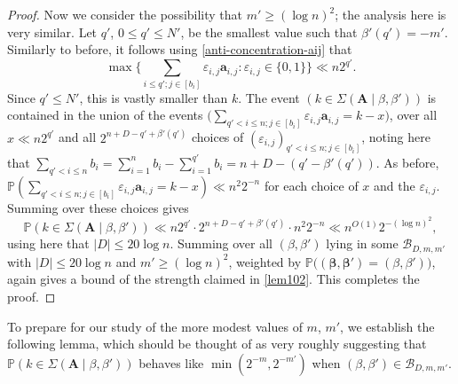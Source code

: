 \documentclass[11pt,reqno]{amsart}
\numberwithin{equation}{section}
\theoremstyle{definition}
\theoremstyle{remark}
\newcommand{\mb}{\mathbb}
\newcommand{\mbf}{\mathbf}
\newcommand{\eps}{\varepsilon}
\def\boldbeta{\boldsymbol\beta}
\renewcommand{\le}{\leqslant}
\renewcommand{\ge}{\geqslant}
\begin{document}
\begin{proof}
Now we consider the possibility that $m' \ge (\log n)^2$; the analysis here is very similar. Let $q'$, $0 \le q' \le N'$, be the smallest value such that $\beta'(q') = -m'$. Similarly to before, it follows using \cref{anti-concentration-aij} that
\begin{equation*} \max \{ \sum_{i \le q' ; j \in [b_i]} \eps_{i,j} \mbf{a}_{i,j}: \eps_{i,j} \in \{0,1\} \} \ll n 2^{q'}.
\end{equation*}
Since $q' \le N'$, this is vastly smaller than $k$. The event $(k \in \Sigma(\mbf{A} \mid \beta,\beta'))$ is contained in the union of the events $\big(\sum_{q' < i \le n;j \in [b_i]} \eps_{i,j} \mbf{a}_{i,j} = k - x\big)$, over all $x \ll n 2^{q'}$ and all $2^{n + D - q' + \beta'(q')}$ choices of $(\eps_{i,j})_{q' < i \le n; j \in [b_i]}$, noting here that $\sum_{q' < i \le n} b_i = \sum_{i = 1}^n b_i - \sum_{i = 1}^{q'} b_i = n + D - (q' - \beta'(q'))$. As before, $\mb{P}(\sum_{q' < i \le n;  j \in [b_i]} \eps_{i,j} \mbf{a}_{i,j} = k - x) \ll n^2 2^{-n}$ for each choice of $x$ and the $\eps_{i,j}$. Summing over these choices gives
\[ \mb{P}(k \in \Sigma(\mbf{A} \mid \beta,\beta')) \ll n 2^{q'} \cdot 2^{n +D - q' + \beta'(q')} \cdot n^2 2^{-n} \ll n^{O(1)} 2^{-(\log n)^2},\] using here that $|D| \le 20 \log n$. Summing over all $(\beta, \beta')$ lying in some $\mathscr{B}_{D,m,m'}$ with $|D| \le 20 \log n$ and $m' \ge (\log n)^2$, weighted by $\mb{P}\big((\boldbeta,\boldbeta') = (\beta,\beta')\big)$, again gives a bound of the strength claimed in \cref{lem102}. This completes the proof.
\end{proof}

To prepare for our study of the more modest values of $m$, $m'$, we establish the following lemma, which should be thought of as very roughly suggesting that $\mb{P}(k \in \Sigma(\mbf{A} \mid \beta,\beta'))$ behaves like $\min( 2^{-m}, 2^{-m'})$ when $(\beta, \beta') \in \mathscr{B}_{D,m,m'}$.
\end{document}
